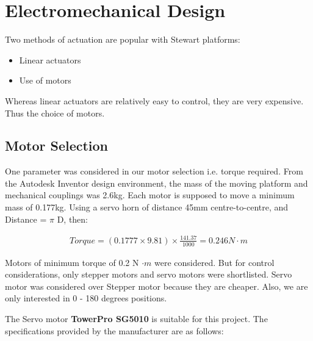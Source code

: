 \section{Electromechanical Design}
Two methods of actuation are popular with Stewart platforms:
\begin{itemize}
\item Linear actuators
\item Use of motors
\end{itemize}
Whereas linear actuators are relatively easy to control, they are very expensive. Thus the choice of motors.

\subsection{Motor Selection}
One parameter was considered in our motor selection i.e. torque required. From the Autodesk Inventor design environment, the mass of the moving platform and mechanical couplings was 2.6kg. Each motor is supposed to move a minimum mass of 0.177kg. Using a servo horn of distance 45mm centre-to-centre, and Distance = $ \pi $ D, then:
\begin{ceqn}
\begin{align}
	Torque = (0.1777 \times 9.81)\times \frac{141.37}{1000} = 0.246 N\cdot m
\end{align}
\end{ceqn}
Motors of minimum torque of 0.2 N $\cdot m$ were considered. But for control considerations, only stepper motors and servo motors were shortlisted. Servo motor was considered over Stepper motor because they are cheaper. Also, we are only interested in 0 - 180 degrees positions.

The Servo motor \textbf{TowerPro SG5010} is suitable for this project. The specifications provided by the manufacturer are as follows:

